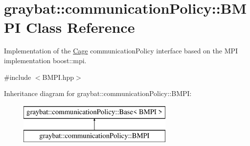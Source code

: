 \hypertarget{structgraybat_1_1communicationPolicy_1_1BMPI}{}\section{graybat\+:\+:communication\+Policy\+:\+:B\+M\+P\+I Class Reference}
\label{structgraybat_1_1communicationPolicy_1_1BMPI}


Implementation of the \hyperlink{structgraybat_1_1Cage}{Cage} communication\+Policy interface based on the M\+P\+I implementation boost\+::mpi.  




{\ttfamily \#include $<$B\+M\+P\+I.\+hpp$>$}

Inheritance diagram for graybat\+:\+:communication\+Policy\+:\+:B\+M\+P\+I\+:\begin{figure}[H]
\begin{center}
\leavevmode
\includegraphics[height=2.000000cm]{structgraybat_1_1communicationPolicy_1_1BMPI}
\end{center}
\end{figure}
